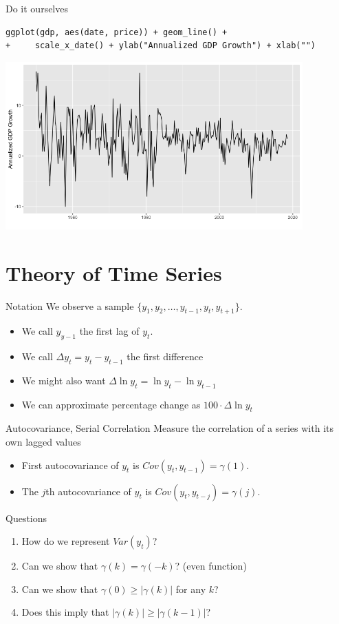 \documentclass[aspectratio=169]{beamer}
\begin{document}
\begin{frame}[fragile]{Do it ourselves}
\begin{verbatim}
ggplot(gdp, aes(date, price)) + geom_line() +
+     scale_x_date() + ylab("Annualized GDP Growth") + xlab("")
\end{verbatim}
\begin{center}
\includegraphics[width=4.5in]{./resources/gdp_plot.png}
\end{center}
\end{frame}





\section{Theory of Time Series}

\begin{frame}{Notation}
We observe a sample $\{y_1,y_2,\ldots,y_{t-1},y_{t},y_{t+1}\}$.
\begin{itemize}
\item We call $y_{y-1}$ the \alert{first lag} of $y_t$.
\item We call $\Delta y_{t} = y_{t} - y_{t-1}$ the \alert{first difference}
\item We might also want $\Delta \ln y_{t} = \ln y_{t} - \ln y_{t-1}$
\item We can approximate percentage change as  $100 \cdot \Delta \ln y_{t}$
\end{itemize}
\end{frame}

\begin{frame}{Autocovariance, Serial Correlation}
Measure the correlation of a series with its own lagged values
\begin{itemize}
\item First \alert{autocovariance} of $y_t$ is $Cov(y_t,y_{t-1}) = \gamma(1)$.
\item The $j$th autocovariance of $y_t$ is $Cov(y_t,y_{t-j})=\gamma(j)$.
\end{itemize}
Questions
\begin{enumerate}
\item How do we represent $Var(y_t)$?
\item Can we show that $\gamma(k) = \gamma(-k)$? (even function)
\item Can we show that $\gamma(0) \geq |\gamma(k)|$ for any $k$?
\item Does this imply that $|\gamma(k)| \geq | \gamma(k-1)|$?
\end{enumerate}
\end{frame}
\end{document}
